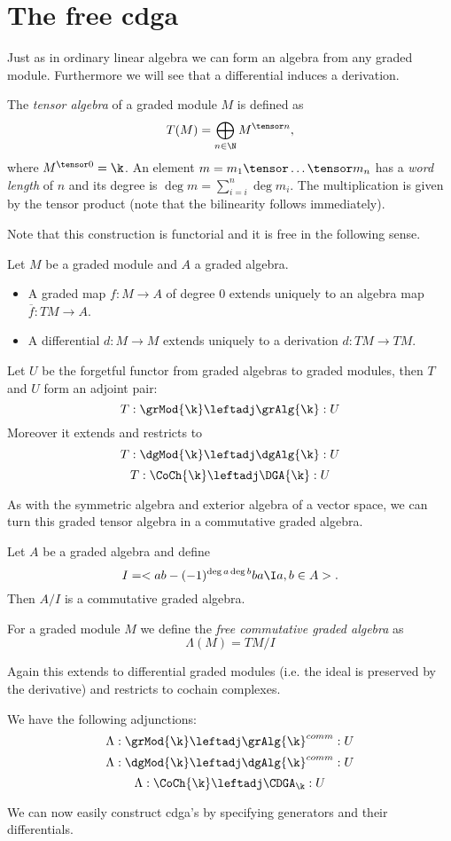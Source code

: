 
\section{The free cdga}
\label{sec:free-cdga}

Just as in ordinary linear algebra we can form an algebra from any graded module. Furthermore we will see that a differential induces a derivation.

\begin{definition}
	The \emph{tensor algebra} of a graded module $M$ is defined as
	$$ T(M) = \bigoplus_{n\in\N} M^{\tensor n}, $$
	where $M^{\tensor 0} = \k$. An element $m = m_1 \tensor \ldots \tensor m_n$ has a \emph{word length} of $n$ and its degree is $\deg{m} = \sum_{i=i}^n \deg{m_i}$. The multiplication is given by the tensor product (note that the bilinearity follows immediately).
\end{definition}

Note that this construction is functorial and it is free in the following sense.

\begin{lemma}
	Let $M$ be a graded module and $A$ a graded algebra.
	\begin{itemize}
		\item A graded map $f: M \to A$ of degree $0$ extends uniquely to an algebra map $\overline{f} : TM \to A$.
		\item A differential $d: M \to M$ extends uniquely to a derivation $d: TM \to TM$.
	\end{itemize}
\end{lemma}

\begin{corollary}
	Let $U$ be the forgetful functor from graded algebras to graded modules, then $T$ and $U$ form an adjoint pair:
	$$ T: \grMod{\k} \leftadj \grAlg{\k} :U $$
	Moreover it extends and restricts to
	$$ T: \dgMod{\k} \leftadj \dgAlg{\k} :U $$
	$$ T: \CoCh{\k} \leftadj \DGA{\k} :U $$
\end{corollary}

As with the symmetric algebra and exterior algebra of a vector space, we can turn this graded tensor algebra in a commutative graded algebra.

\begin{definition}
	Let $A$ be a graded algebra and define
	$$ I = < ab - (-1)^{\deg{a}\deg{b}}ba \I a,b \in A >. $$
	Then $A / I$ is a commutative graded algebra.

	For a graded module $M$ we define the \emph{free commutative graded algebra} as
	$$ \Lambda(M) = TM / I $$
\end{definition}

Again this extends to differential graded modules (i.e. the ideal is preserved by the derivative) and restricts to cochain complexes.

\begin{lemma}
	We have the following adjunctions:
	$$ \Lambda: \grMod{\k} \leftadj \grAlg{\k}^{comm} :U $$
	$$ \Lambda: \dgMod{\k} \leftadj \dgAlg{\k}^{comm} :U $$
	$$ \Lambda: \CoCh{\k} \leftadj \CDGA_\k :U $$
\end{lemma}

We can now easily construct cdga's by specifying generators and their differentials.
